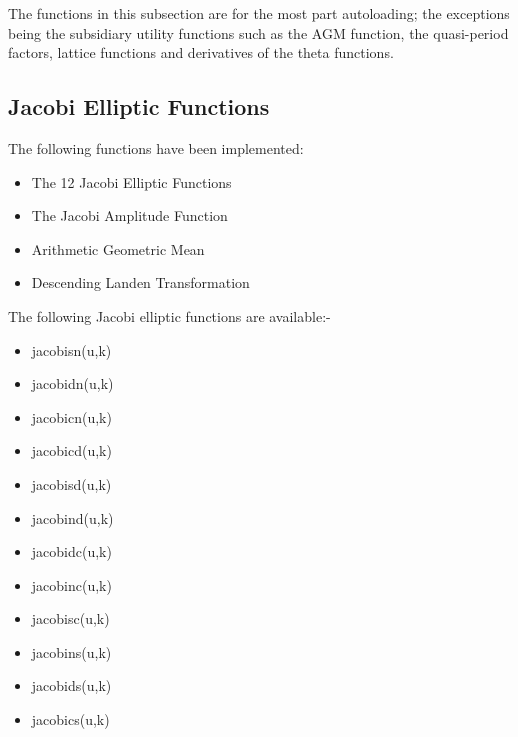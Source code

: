 The functions in this subsection are for the most part autoloading;
the exceptions being the subsidiary utility functions such as the AGM function,
the quasi-period factors, lattice functions and derivatives of the theta functions.

\hypertarget{JACEF}{}
\subsection{Jacobi Elliptic  Functions}
The following functions have been implemented:
\begin{itemize}
\item The 12 Jacobi Elliptic Functions
\item The Jacobi Amplitude Function
\item Arithmetic Geometric Mean
\item Descending Landen Transformation
\end{itemize}

The following Jacobi elliptic functions are available:-
\hypertarget{operator:JACOBISN}{}
\hypertarget{operator:JACOBICN}{}
\hypertarget{operator:JACOBIDN}{}
\hypertarget{operator:JACOBISD}{}
\hypertarget{operator:JACOBIND}{}
\hypertarget{operator:JACOBIDC}{}
\hypertarget{operator:JACOBINC}{}
\hypertarget{operator:jACOBISC}{}
\hypertarget{operator:JACOBINS}{}
\hypertarget{operator:JACOBIDS}{}
\hypertarget{operator:JACOBICS}{}
\begin{itemize}
\item jacobisn(u,k)
\item jacobidn(u,k)
\item jacobicn(u,k)
\item jacobicd(u,k)
\item jacobisd(u,k)
\item jacobind(u,k)
\item jacobidc(u,k)
\item jacobinc(u,k)
\item jacobisc(u,k)
\item jacobins(u,k)
\item jacobids(u,k)
\item jacobics(u,k)
\end{itemize}

